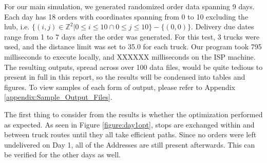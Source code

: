 \documentclass[letterpaper]{article}
\begin{document}

    For our main simulation, we generated randomized order data spanning 9 days. Each day has 18 orders with coordinates spanning from 0 to 10 excluding the hub, i.e. $\{ (i, j) \in \mathbb{Z}^2 | 0 \leq i \leq 10 \cap 0 \leq j \leq 10\} - \{ (0, 0)\}$. Delivery due dates range from 1 to 7 days after the order was generated. For this test, 3 trucks were used, and the distance limit was set to 35.0 for each truck. Our program took 795 milliseconds to execute locally, and XXXXXX milliseconds on the ISP machine. The resulting outputs, spread across over 100 data files, would be quite tedious to present in full in this report, so the results will be condensed into tables and figures. To view samples of each form of output, please refer to Appendix \ref{appendix:Sample_Output_Files}.

    The first thing to consider from the results is whether the optimization performed as expected. As seen in Figure \ref{figure:day1opt}, stops are exchanged within and between truck routes until they all take efficient paths. Since no orders were left undelivered on Day 1, all of the Addresses are still present afterwards. This can be verified for the other days as well.
\end{document}
